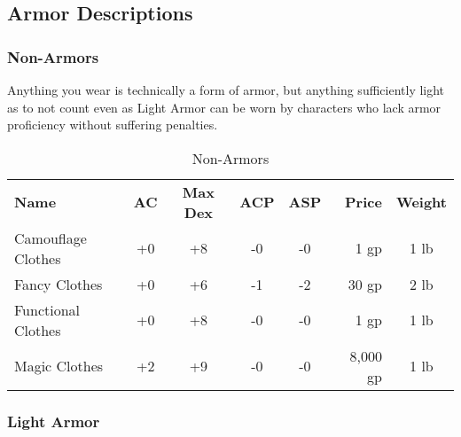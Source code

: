 \subsection{Armor Descriptions}

\subsubsection{Non-Armors}

Anything you wear is technically a form of armor, but anything sufficiently light as to not count even as Light Armor can be worn by characters who lack armor proficiency without suffering penalties.

\begin{table}[htb]
\caption{Non-Armors}
\centering
\begin{tabular}{l *{4}{c} r c}
\textbf{Name} & \textbf{AC} & \textbf{Max Dex} & \textbf{ACP} & \textbf{ASP} & \textbf{Price} & \textbf{Weight}\\
Camouflage Clothes & +0 & +8 & -0 & -0 & 1 gp & 1 lb\\
Fancy Clothes & +0 & +6 & -1 & -2 & 30 gp & 2 lb\\
Functional Clothes & +0 & +8 & -0 & -0 & 1 gp & 1 lb\\
Magic Clothes & +2 & +9 & -0 & -0 & 8,000 gp & 1 lb\\
\end{tabular}
\end{table}


\subsubsection{Light Armor}

